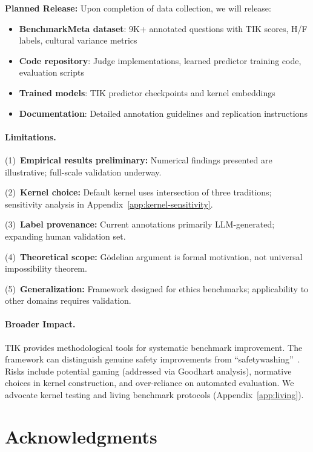 \documentclass[11pt]{article}
\begin{document}
\textbf{Planned Release:} Upon completion of data collection, we will release:
\begin{itemize}
\item \textbf{BenchmarkMeta dataset}: 9K+ annotated questions with TIK scores, H/F labels, cultural variance metrics
\item \textbf{Code repository}: Judge implementations, learned predictor training code, evaluation scripts
\item \textbf{Trained models}: TIK predictor checkpoints and kernel embeddings
\item \textbf{Documentation}: Detailed annotation guidelines and replication instructions
\end{itemize}

\paragraph{Limitations.}

(1)~\textbf{Empirical results preliminary:} Numerical findings presented are illustrative; full-scale validation underway.

(2)~\textbf{Kernel choice:} Default kernel uses intersection of three traditions; sensitivity analysis in Appendix~\ref{app:kernel-sensitivity}.

(3)~\textbf{Label provenance:} Current annotations primarily LLM-generated; expanding human validation set.

(4)~\textbf{Theoretical scope:} G\"{o}delian argument is formal motivation, not universal impossibility theorem.

(5)~\textbf{Generalization:} Framework designed for ethics benchmarks; applicability to other domains requires validation.

\paragraph{Broader Impact.}

TIK provides methodological tools for systematic benchmark improvement. The framework can distinguish genuine safety improvements from ``safetywashing''~\citep{ren2024safetywashing}. Risks include potential gaming (addressed via Goodhart analysis), normative choices in kernel construction, and over-reliance on automated evaluation. We advocate kernel testing and living benchmark protocols (Appendix~\ref{app:living}).

\section*{Acknowledgments}
\end{document}
